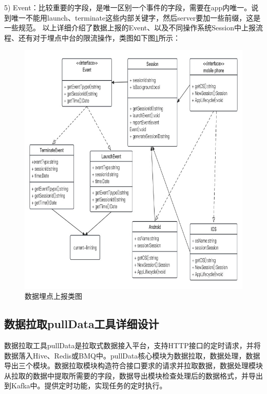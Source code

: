 5)	Event：比较重要的字段，是唯一区别一个事件的字段，需要在app内唯一。说到唯一不能用launch、terminate这些内部关键字，然后server要加一些前缀，这是一些规范。
以上详细介绍了数据上报的Event、以及不同操作系统Session中上报流程、还有对于埋点中台的限流操作，类图如下图\ref{maidanshangbaoclass}所示：
   \begin{figure}[htb]
  \centering
  \includegraphics[width=5in]{figure/chapter4/数据埋点上报类图.jpg}
  \caption{数据埋点上报类图}\label{maidanshangbaoclass}
\end{figure}

\subsection{数据拉取pullData工具详细设计}

数据拉取工具pullData是拉取式数据接入平台，支持HTTP接口的定时请求，并将数据落入Hive、Redis或BMQ中。pullData核心模块为数据拉取，数据处理，数据导出三个模块。数据拉取模块构造符合接口要求的请求并拉取数据，数据处理模块从拉取的数据中提取所需要的字段，数据导出模块检查处理后的数据格式，并导出到Kafka中。提供定时功能，实现任务的定时执行。

